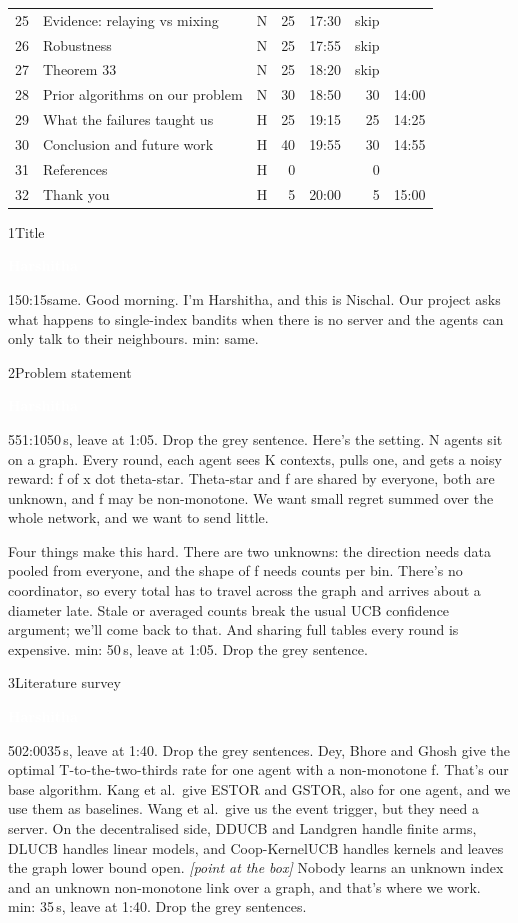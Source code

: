 \documentclass[12pt,a4paper]{article}
\newcommand{\Hb}{\colorbox{harsh}{\strut\textcolor{white}{\textbf{\small Harshitha}}}}
\newcommand{\cut}[1]{\textcolor{cutc}{#1}}
\newcommand{\cue}[1]{{\small\itshape\color{bar}[#1]}}
\newenvironment{slide}[6]
  {\begin{slidebox}{#1}{#2}{#3}{#4}{#5}{#6}\gdef\fifteen{#6}}
  {\tcblower 15 min: \fifteen\end{slidebox}}
\begin{document}
{\begin{tabular}{@{}r>{\raggedright\arraybackslash}p{7.6cm}lrrrr@{}}
25 & Evidence: relaying vs mixing & N & 25 & 17:30 & skip & \\
26 & Robustness & N & 25 & 17:55 & skip & \\
27 & Theorem 33 & N & 25 & 18:20 & skip & \\
28 & Prior algorithms on our problem & N & 30 & 18:50 & 30 & 14:00\\
29 & What the failures taught us & H & 25 & 19:15 & 25 & 14:25\\
30 & Conclusion and future work & H & 40 & 19:55 & 30 & 14:55\\
31 & References & H & 0 & & 0 & \\
32 & Thank you & H & 5 & 20:00 & 5 & 15:00\\
\bottomrule
\end{tabular}}

\newpage
\begin{slide}{1}{Title}{\Hb}{15}{0:15}{same.}
Good morning. I'm Harshitha, and this is Nischal. Our project asks what happens to single-index bandits when there
is no server and the agents can only talk to their neighbours.
\end{slide}

\begin{slide}{2}{Problem statement}{\Hb}{55}{1:10}{50\,s, leave at 1:05. Drop the grey sentence.}
Here's the setting. N agents sit on a graph. Every round, each agent sees K contexts, pulls one, and gets a noisy
reward: f of x dot theta-star. Theta-star and f are shared by everyone, both are unknown, and f may be non-monotone.
We want small regret summed over the whole network, and we want to send little.

Four things make this hard. There are two unknowns: the direction needs data pooled from everyone, and the shape of
f needs counts per bin. There's no coordinator, so every total has to travel across the graph and arrives about a
diameter late. Stale or averaged counts break the usual UCB confidence argument; we'll come back to that.
\cut{And sharing full tables every round is expensive.}
\end{slide}

\begin{slide}{3}{Literature survey}{\Hb}{50}{2:00}{35\,s, leave at 1:40. Drop the grey sentences.}
Dey, Bhore and Ghosh give the optimal T-to-the-two-thirds rate for one agent with a non-monotone f. That's our base
algorithm. \cut{Kang et al.\ give ESTOR and GSTOR, also for one agent, and we use them as baselines. Wang et al.\
give us the event trigger, but they need a server.} On the decentralised side, DDUCB and Landgren handle finite arms,
DLUCB handles linear models, and Coop-KernelUCB handles kernels and leaves the graph lower bound open.
\cue{point at the box} Nobody learns an unknown index and an unknown non-monotone link over a graph, and that's where
we work.
\end{slide}
\end{document}
